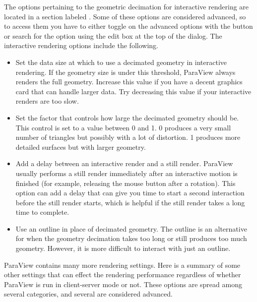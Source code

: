 The options pertaining to the geometric decimation for interactive
rendering are located in a section labeled . Some of these options are considered advanced, so to access
them you have to either toggle on the advanced options with the
 button or search for the option using the edit box at
the top of the dialog. The interactive rendering options include the
following.

\begin{itemize}
\item {} Set the data size at which to use a decimated
  geometry in interactive rendering. If the geometry size is under this
  threshold, ParaView always renders the full geometry. Increase this value
  if you have a decent graphics card that can handle larger data. Try
  decreasing this value if your interactive renders are too slow.
\item {} Set the factor that controls how large the
  decimated geometry should be. This control is set to a value between 0
  and 1. 0 produces a very small number of triangles but possibly with a
  lot of distortion. 1 produces more detailed surfaces but with larger
  geometry. 
\item {} Add a delay between an interactive
  render and a still render. ParaView usually performs a still render
  immediately after an interactive motion is finished (for example,
  releasing the mouse button after a rotation). This option can add a delay
  that can give you time to start a second interaction before the still
  render starts, which is helpful if the still render takes a long time to
  complete. 
\item {} Use an outline in place of
  decimated geometry. The outline is an alternative for when the geometry
  decimation takes too long or still produces too much geometry. However, it
  is more difficult to interact with just an outline.
\end{itemize}

ParaView contains many more rendering settings. Here is a summary of some
other settings that can effect the rendering performance regardless of
whether ParaView is run in client-server mode or not. These options are
spread among several categories, and several are considered advanced.

